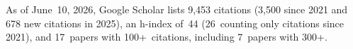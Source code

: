 %
As of June~10, 2026, Google Scholar lists
9,453 citations (3,500 since 2021 and 678 new citations in 2025),
an h-index of~44 (26~counting only citations since 2021),
and 17~papers with 100+~citations, including 7~papers with 300+.
